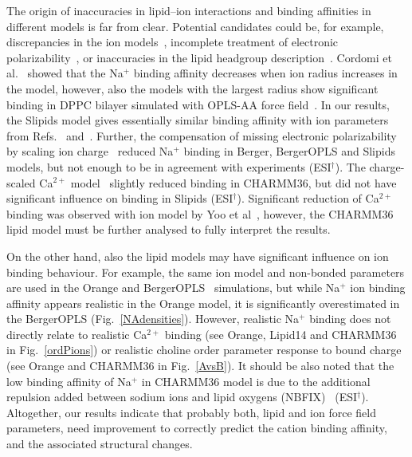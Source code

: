 \documentclass[twoside,twocolumn,9pt]{article}
\begin{document}
The origin of inaccuracies in lipid--ion interactions and binding affinities in different models is far from clear.
Potential candidates could be, for example, discrepancies in the ion models~\cite{hess06,chen07,Reif13},
incomplete treatment of electronic polarizability~\cite{leontyev11}, or inaccuracies in the lipid headgroup 
description~\cite{botan15}. Cordomi et al.~\cite{cordomi09} showed that the Na$^+$ binding affinity decreases when ion radius increases
in the model, however, also the models with the largest radius show significant binding in DPPC bilayer simulated with
OPLS-AA force field~\cite{jorgensen96}. In our results, the Slipids model gives essentially similar binding affinity with 
ion parameters from Refs.~ and~. Further, the compensation of missing electronic 
polarizability by scaling ion charge~\cite{kohagen16,leontyev11} reduced Na$^+$ binding in Berger, 
BergerOPLS and Slipids models, but not enough to be in agreement with experiments (ESI$^\dag$). 
The charge-scaled Ca$^{2+}$ model~\cite{kohagen14} slightly reduced binding in CHARMM36, but did not have 
significant influence on binding in Slipids (ESI$^\dag$). Significant reduction of
Ca$^{2+}$ binding was observed with ion model by Yoo et al~\cite{yoo16}, however, the CHARMM36 lipid
model must be further analysed to fully interpret the results.

On the other hand, also the lipid models may have significant influence on ion binding behaviour.
For example, the same ion model and non-bonded parameters are used in the Orange and BergerOPLS~\cite{tieleman06} 
simulations, but while Na$^+$ ion binding affinity appears realistic in the Orange model, it is significantly overestimated 
in the BergerOPLS (Fig.~\ref{NAdensities}). However, realistic Na$^+$ binding does not directly relate
to realistic Ca$^{2+}$ binding (see Orange, Lipid14 and CHARMM36 in Fig.~\ref{ordPions}) or realistic choline
order parameter response to bound charge (see Orange and CHARMM36 in Fig.~\ref{AvsB}).
It should be also noted that the low binding affinity of Na$^+$ in CHARMM36 model is due to 
the additional repulsion added between sodium ions and lipid oxygens (NBFIX)~\cite{venable13} (ESI$^\dag$).
Altogether, our results indicate that probably both, lipid and ion force field parameters, need improvement to 
correctly predict the cation binding affinity, and the associated structural changes.
\end{document}
